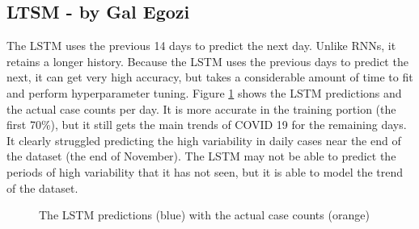 \documentclass{article}
\begin{document}
\subsection{LTSM - by Gal Egozi}
The LSTM uses the previous 14 days to predict the next day. Unlike RNNs, it retains a longer history. Because the LSTM uses the previous days to predict the next, it can get very high accuracy, but takes a considerable amount of time to fit and perform hyperparameter tuning. Figure \ref{LSTM_predictions} shows the LSTM predictions and the actual case counts per day. It is more accurate in the training portion (the first 70\%), but it still gets the main trends of COVID 19 for the remaining days. It clearly struggled predicting the high variability in daily cases near the end of the dataset (the end of November). The LSTM may not be able to predict the periods of high variability that it has not seen, but it is able to model the trend of the dataset.
\begin{figure}[h]
    \centering
    
    \caption{The LSTM predictions (blue) with the actual case counts (orange)}
    \label{LSTM_predictions}
\end{figure}
\end{document}

